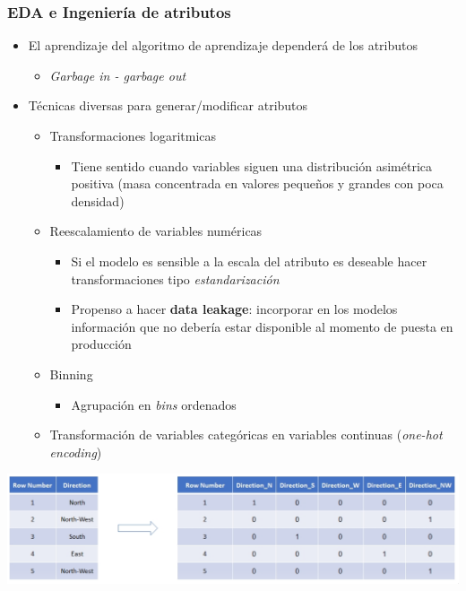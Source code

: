 \documentclass[leqno, 10pt, envcountsect]{beamer}
\numberwithin{equation}{section}
\theoremstyle{definition}
\theoremstyle{example}
\numberwithin{figure}{section}
\numberwithin{table}{section}
\let\olditem\item
\renewcommand{\item}{%
\olditem\vspace{1pt}}
\begin{document}
\begin{frame}[fragile=singleslide]
  \frametitle{EDA e Ingeniería de atributos}
  \begin{itemize}
    \item El aprendizaje del algoritmo de aprendizaje dependerá de los
      atributos
      \begin{itemize}
        \item \textit{Garbage in - garbage out}
      \end{itemize}
      \item Técnicas diversas para generar/modificar atributos
        \begin{itemize}
          \item Transformaciones logaritmicas
            \begin{itemize}
              \item Tiene sentido cuando variables siguen una distribución
                asimétrica positiva (masa concentrada en valores pequeños y
                grandes con poca densidad)
            \end{itemize}
          \item Reescalamiento de variables numéricas
            \begin{itemize}
              \item Si el modelo es sensible a la escala del atributo es
                deseable hacer transformaciones tipo \textit{estandarización}
              \item Propenso a hacer \textbf{data leakage}: incorporar en los
                modelos información que no debería estar disponible al momento
                de puesta en producción
            \end{itemize}
          \item Binning
            \begin{itemize}
              \item Agrupación en \textit{bins} ordenados
            \end{itemize}
          \item Transformación de variables categóricas en variables continuas
            (\textit{one-hot encoding})
      \end{itemize}
  \end{itemize}
  \begin{center}
    \includegraphics[scale=0.17]{one_hot.png}
  \end{center}
\end{frame}
\end{document}
